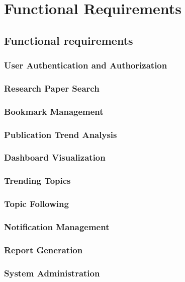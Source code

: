 \chapter{Functional Requirements}
\section{Functional requirements}
\subsection{User Authentication and Authorization}

\subsection{Research Paper Search}

\subsection{Bookmark Management}

\subsection{Publication Trend Analysis}

\subsection{Dashboard Visualization}

\subsection{Trending Topics}

\subsection{Topic Following}

\subsection{Notification Management}

\subsection{Report Generation}

\subsection{System Administration}


